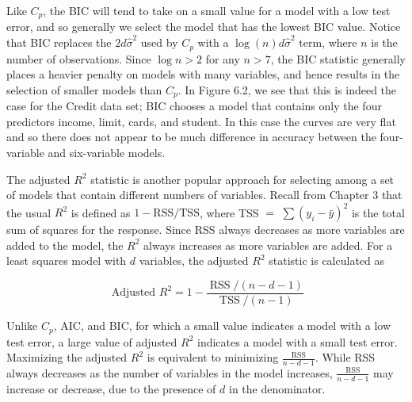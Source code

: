 \documentclass[10pt]{article}
\begin{document}
Like $C_{p}$, the BIC will tend to take on a small value for a model with a low test error, and so generally we select the model that has the lowest BIC value. Notice that BIC replaces the $2 d \hat{\sigma}^{2}$ used by $C_{p}$ with a $\log (n) d \hat{\sigma}^{2}$ term, where $n$ is the number of observations. Since $\log n>2$ for any $n>7$, the BIC statistic generally places a heavier penalty on models with many variables, and hence results in the selection of smaller models than $C_{p}$. In Figure 6.2, we see that this is indeed the case for the Credit data set; BIC chooses a model that contains only the four predictors income, limit, cards, and student. In this case the curves are very flat and so there does not appear to be much difference in accuracy between the four-variable and six-variable models.

The adjusted $R^{2}$ statistic is another popular approach for selecting among a set of models that contain different numbers of variables. Recall from Chapter 3 that the usual $R^{2}$ is defined as $1-\mathrm{RSS} / \mathrm{TSS}$, where TSS $=$ $\sum\left(y_{i}-\bar{y}\right)^{2}$ is the total sum of squares for the response. Since RSS always decreases as more variables are added to the model, the $R^{2}$ always increases as more variables are added. For a least squares model with $d$ variables, the adjusted $R^{2}$ statistic is calculated as


\begin{equation*}
\text { Adjusted } R^{2}=1-\frac{\operatorname{RSS} /(n-d-1)}{\operatorname{TSS} /(n-1)} \tag{6.4}
\end{equation*}


Unlike $C_{p}$, AIC, and BIC, for which a small value indicates a model with a low test error, a large value of adjusted $R^{2}$ indicates a model with a small test error. Maximizing the adjusted $R^{2}$ is equivalent to minimizing $\frac{\text { RSS }}{n-d-1}$. While RSS always decreases as the number of variables in the model increases, $\frac{\mathrm{RSS}}{n-d-1}$ may increase or decrease, due to the presence of $d$ in the denominator.
\end{document}
